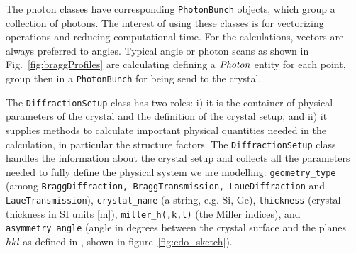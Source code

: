 \documentclass[preprint]{iucr}              %
\begin{document}
The photon classes 
have corresponding {\tt PhotonBunch} objects, which group a collection of photons. The interest of using these classes is for vectorizing operations and reducing computational time. For the calculations, vectors are always preferred to angles. Typical angle or photon scans as shown in Fig.~\ref{fig:braggProfiles} are calculating defining a $\tt Photon$ entity for each point, group then in a {\tt PhotonBunch} for being send to the crystal. 


The {\tt DiffractionSetup} class has two roles: i) it is the container of physical parameters of the crystal and the definition of the crystal setup, and ii) it supplies methods to calculate important physical quantities needed in the calculation, in particular the structure factors. The {\tt DiffractionSetup} class handles the information about the crystal setup and collects all the parameters needed to fully define the physical system we are modelling:
{\tt geometry\_type} (among {\tt BraggDiffraction, BraggTransmission, LaueDiffraction} and {\tt LaueTransmission}),
{\tt crystal\_name} (a string, e.g. Si, Ge),
{\tt thickness} (crystal thickness in SI units [m]),
{\tt miller\_h(,k,l)} (the Miller indices),
and {\tt asymmetry\_angle} (angle in degrees between the crystal surface and the planes $hkl$ as defined in \cite{codeCRYSTAL}, shown in figure~\ref{fig:edo_sketch}).


 

\end{document}
